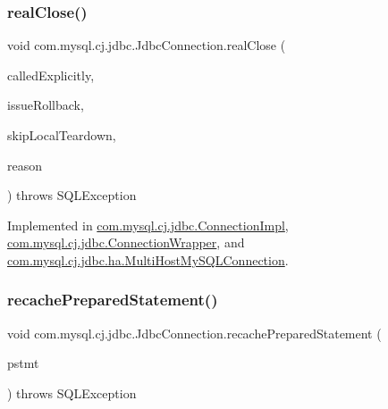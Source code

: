 \mbox{\label{interfacecom_1_1mysql_1_1cj_1_1jdbc_1_1_jdbc_connection_af5f24cb10cfc14e0174c6bb115745bc0}} 
\subsubsection{\texorpdfstring{real\+Close()}{realClose()}}
{\footnotesize\ttfamily void com.\+mysql.\+cj.\+jdbc.\+Jdbc\+Connection.\+real\+Close (\begin{DoxyParamCaption}\item[{boolean}]{called\+Explicitly,  }\item[{boolean}]{issue\+Rollback,  }\item[{boolean}]{skip\+Local\+Teardown,  }\item[{Throwable}]{reason }\end{DoxyParamCaption}) throws S\+Q\+L\+Exception}



Implemented in \mbox{\hyperlink{classcom_1_1mysql_1_1cj_1_1jdbc_1_1_connection_impl_a8a78dfbe0aa7dd8b881a9f9716f16ed6}{com.\+mysql.\+cj.\+jdbc.\+Connection\+Impl}}, \mbox{\hyperlink{classcom_1_1mysql_1_1cj_1_1jdbc_1_1_connection_wrapper_afb807e5120e44707222a3a5a96248471}{com.\+mysql.\+cj.\+jdbc.\+Connection\+Wrapper}}, and \mbox{\hyperlink{classcom_1_1mysql_1_1cj_1_1jdbc_1_1ha_1_1_multi_host_my_s_q_l_connection_adbed19e958ded6aa76e2e1cd5c6e51be}{com.\+mysql.\+cj.\+jdbc.\+ha.\+Multi\+Host\+My\+S\+Q\+L\+Connection}}.

\mbox{\label{interfacecom_1_1mysql_1_1cj_1_1jdbc_1_1_jdbc_connection_a24f00ff038a4f01aab9dea9e2817c084}} 
\subsubsection{\texorpdfstring{recache\+Prepared\+Statement()}{recachePreparedStatement()}}
{\footnotesize\ttfamily void com.\+mysql.\+cj.\+jdbc.\+Jdbc\+Connection.\+recache\+Prepared\+Statement (\begin{DoxyParamCaption}\item[{\mbox{\hyperlink{interfacecom_1_1mysql_1_1cj_1_1jdbc_1_1_jdbc_prepared_statement}{Jdbc\+Prepared\+Statement}}}]{pstmt }\end{DoxyParamCaption}) throws S\+Q\+L\+Exception}



